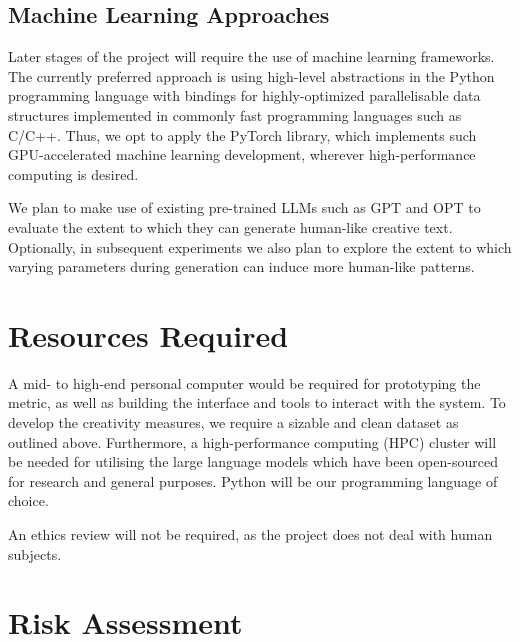 \documentclass[a4paper,12pt]{article}
\begin{document}
\subsection*{Machine Learning Approaches}
Later stages of the project will require the use of machine learning frameworks. The currently preferred approach is using high-level abstractions in the Python programming language with bindings for highly-optimized parallelisable data structures implemented in commonly fast programming languages such as C/C++. Thus, we opt to apply the PyTorch library\cite{NEURIPS2019_9015_pytorch}, which implements such GPU-accelerated machine learning development, wherever high-performance computing is desired. 

We plan to make use of existing pre-trained LLMs such as GPT\cite{brown_gpt3_2020} and OPT\cite{zhang_opt_2022} to evaluate the extent to which they can generate human-like creative text. Optionally, in subsequent experiments we also plan to explore the extent to which varying parameters during generation can induce more human-like patterns.


\section*{Resources Required}
A mid- to high-end personal computer would be required for prototyping the metric, as well as building the interface and tools to interact with the system.
To develop the creativity measures, we require a sizable and clean dataset as outlined above.  
Furthermore, a high-performance computing (HPC) cluster will be needed for utilising the large language models which have been open-sourced for research and general purposes. 
Python will be our programming language of choice.

An ethics review will not be required, as the project does not deal with human subjects. 

\section*{Risk Assessment}
\end{document}
